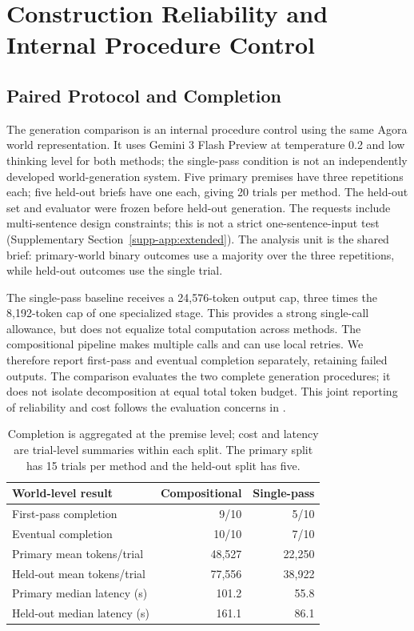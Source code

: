 \section{Construction Reliability and Internal Procedure Control}
\label{sec:construction}

\subsection{Paired Protocol and Completion}
The generation comparison is an internal procedure control using the same
Agora world representation. It uses Gemini 3 Flash Preview at temperature
0.2 and low thinking level for both methods; the single-pass condition is
not an independently developed world-generation system. Five primary premises have three
repetitions each; five held-out briefs have one each, giving 20 trials per
method. The held-out set and evaluator were frozen before held-out generation.
The requests include multi-sentence design constraints; this is not a strict
one-sentence-input test (Supplementary Section~\ref{supp-app:extended}). The analysis unit is the
shared brief: primary-world binary outcomes use a majority
over the three repetitions, while held-out outcomes use the single trial.

The single-pass baseline receives a 24,576-token output cap, three times the
8,192-token cap of one specialized stage. This provides a strong single-call
allowance, but does not equalize total computation across methods. The
compositional pipeline makes multiple calls and can use local retries. We
therefore report first-pass and eventual completion separately, retaining
failed outputs. The comparison evaluates the two complete generation
procedures; it does not isolate decomposition at equal total token budget.
This joint reporting of reliability and cost follows the evaluation concerns
in \citet{agentsmatter}.

\begin{table}[t]
\centering\small
\setlength{\tabcolsep}{4pt}
\begin{tabularx}{\columnwidth}{@{}Yrr@{}}
\toprule
World-level result & Compositional & Single-pass \\
\midrule
First-pass completion & 9/10 & 5/10 \\
Eventual completion & 10/10 & 7/10 \\
\midrule
Primary mean tokens/trial & 48,527 & 22,250 \\
Held-out mean tokens/trial & 77,556 & 38,922 \\
Primary median latency (s) & 101.2 & 55.8 \\
Held-out median latency (s) & 161.1 & 86.1 \\
\bottomrule
\end{tabularx}
\caption{Completion is aggregated at the premise level; cost and latency are
trial-level summaries within each split. The primary split has 15 trials per
method and the held-out split has five.}
\label{tab:quality}
\end{table}

